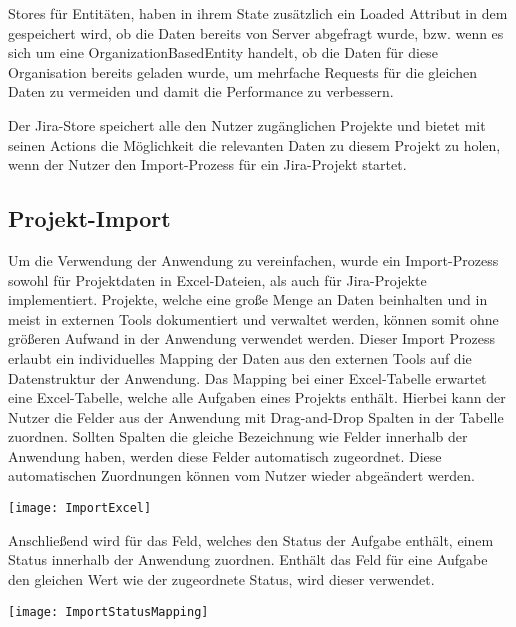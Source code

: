 Stores für Entitäten, haben in ihrem State zusätzlich ein Loaded Attribut in dem gespeichert wird, ob die Daten bereits von Server abgefragt wurde, bzw. wenn es sich um eine OrganizationBasedEntity handelt, ob die Daten für diese Organisation bereits geladen wurde, um mehrfache Requests für die gleichen Daten zu vermeiden und damit die Performance zu verbessern.

Der Jira-Store speichert alle den Nutzer zugänglichen Projekte und bietet mit seinen Actions die Möglichkeit die relevanten Daten zu diesem Projekt zu holen, wenn der Nutzer den Import-Prozess für ein Jira-Projekt startet.

\subsection{Projekt-Import}
Um die Verwendung der Anwendung zu vereinfachen, wurde ein Import-Prozess sowohl für Projektdaten in Excel-Dateien, als auch für Jira-Projekte implementiert. Projekte, welche eine große Menge an Daten beinhalten und in meist in externen Tools dokumentiert und verwaltet werden, können somit ohne größeren Aufwand in der Anwendung verwendet werden. Dieser Import Prozess erlaubt ein individuelles Mapping der Daten aus den externen Tools auf die Datenstruktur der Anwendung. Das Mapping bei einer Excel-Tabelle erwartet eine Excel-Tabelle, welche alle Aufgaben eines Projekts enthält. Hierbei kann der Nutzer  die Felder aus der Anwendung mit Drag-and-Drop Spalten in der Tabelle zuordnen. Sollten Spalten die gleiche Bezeichnung wie Felder innerhalb der Anwendung haben, werden diese Felder automatisch zugeordnet. Diese automatischen Zuordnungen können vom Nutzer wieder abgeändert werden.

\vspace{20pt}
\begin{center}
    \begin{minipage}{1\linewidth}
        \texttt{[image: ImportExcel]}
    \end{minipage}
\end{center}
\vspace{20pt}

Anschließend wird für das Feld, welches den Status der Aufgabe enthält, einem Status innerhalb der Anwendung zuordnen. Enthält das Feld für eine Aufgabe den gleichen Wert wie der zugeordnete Status, wird dieser verwendet.

\vspace{20pt}
\begin{center}
    \begin{minipage}{1\linewidth}
        \texttt{[image: ImportStatusMapping]}
    \end{minipage}
\end{center}
\vspace{20pt}

